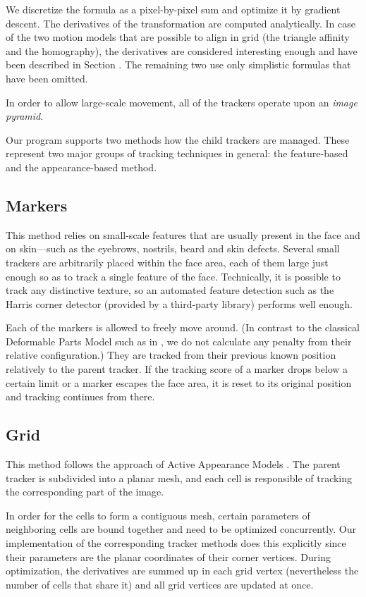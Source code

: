 We discretize the formula as a pixel-by-pixel sum and optimize it by gradient descent.
The derivatives of the transformation are computed analytically.
In case of the two motion models that are possible to align in grid (the triangle affinity and the homography), the derivatives are considered interesting enough and have been described in Section .
The remaining two use only simplistic formulas that have been omitted.

In order to allow large-scale movement, all of the trackers operate upon an \textit{image pyramid}.

Our program supports two methods how the child trackers are managed.
These represent two major groups of tracking techniques in general: the feature-based and the appearance-based method.

\subsection{Markers}

This method relies on small-scale features that are usually present in the face and on skin---such as the eyebrows, nostrils, beard and skin defects.
Several small trackers are arbitrarily placed within the face area, each of them large just enough so as to track a single feature of the face.
Technically, it is possible to track any distinctive texture, so an automated feature detection such as the Harris corner detector (provided by a third-party library) performs well enough.

Each of the markers is allowed to freely move around.
(In contrast to the classical Deformable Parts Model such as in \cite{uricar12}, we do not calculate any penalty from their relative configuration.)
They are tracked from their previous known position relatively to the parent tracker.
If the tracking score of a marker drops below a certain limit or a marker escapes the face area, it is reset to its original position and tracking continues from there.

\subsection{Grid}

This method follows the approach of Active Appearance Models \cite{cootes01}.
The parent tracker is subdivided into a planar mesh, and each cell is responsible of tracking the corresponding part of the image.

In order for the cells to form a contiguous mesh, certain parameters of neighboring cells are bound together and need to be optimized concurrently.
Our implementation of the corresponding tracker methods does this explicitly since their parameters are the planar coordinates of their corner vertices.
During optimization, the derivatives are summed up in each grid vertex (nevertheless the number of cells that share it) and all grid vertices are updated at once.


